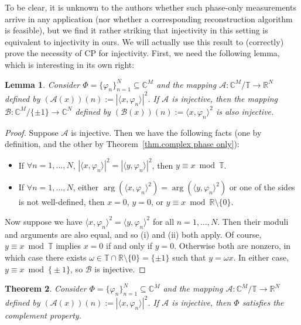 \documentclass[times,10pt]{elsarticle}
\theoremstyle{plain}
\newtheorem{theorem}{Theorem}
\newtheorem{lemma}[theorem]{Lemma}
\begin{document}
To be clear, it is unknown to the authors whether such phase-only measurements arrive in any application (nor whether a corresponding reconstruction algorithm is feasible), but we find it rather striking that injectivity in this setting is equivalent to injectivity in ours.
We will actually use this result to (correctly) prove the necessity of CP for injectivity.
First, we need the following lemma, which is interesting in its own right:

\begin{lemma}
\label{lem.injectivity of B}
Consider $\Phi=\{\varphi_n\}_{n=1}^N\subseteq\mathbb{C}^M$ and the mapping $\mathcal{A}\colon\mathbb{C}^M/\mathbb{T}\rightarrow\mathbb{R}^N$ defined by $(\mathcal{A}(x))(n):=|\langle x,\varphi_n\rangle|^2$.
If $\mathcal{A}$ is injective, then the mapping $\mathcal{B}\colon\mathbb{C}^M/\{\pm1\}\rightarrow\mathbb{C}^N$ defined by $(\mathcal{B}(x))(n):=\langle x,\varphi_n\rangle^2$ is also injective.
\end{lemma}

\begin{proof}
Suppose $\mathcal{A}$ is injective.
Then we have the following facts (one by definition, and the other by Theorem~\ref{thm.complex phase only}):
\begin{itemize}
\item[(i)] If $\forall n=1,\ldots,N$, $|\langle x,\varphi_n\rangle|^2=|\langle y,\varphi_n\rangle|^2$, then $y\equiv x\bmod\mathbb{T}$.
\item[(ii)] If $\forall n=1,\ldots,N$, either $\operatorname{arg}(\langle x,\varphi_n\rangle^2)=\operatorname{arg}(\langle y,\varphi_n\rangle^2)$ or one of the sides is not well-defined, then $x=0$, $y=0$, or $y\equiv x\bmod\mathbb{R}\setminus\{0\}$.
\end{itemize}
Now suppose we have $\langle x,\varphi_n\rangle^2=\langle y,\varphi_n\rangle^2$ for all $n=1,\ldots,N$.
Then their moduli and arguments are also equal, and so (i) and (ii) both apply.
Of course, $y\equiv x\bmod\mathbb{T}$ implies $x=0$ if and only if $y=0$.
Otherwise both are nonzero, in which case there exists $\omega\in\mathbb{T}\cap\mathbb{R}\setminus\{0\}=\{\pm1\}$ such that $y=\omega x$.
In either case, $y\equiv x\bmod\{\pm1\}$, so $\mathcal{B}$ is injective.
\qquad
\end{proof}

\begin{theorem}
\label{thm.complex complement property}
Consider $\Phi=\{\varphi_n\}_{n=1}^N\subseteq\mathbb{C}^M$ and the mapping $\mathcal{A}\colon\mathbb{C}^M/\mathbb{T}\rightarrow\mathbb{R}^N$ defined by $(\mathcal{A}(x))(n):=|\langle x,\varphi_n\rangle|^2$.
If $\mathcal{A}$ is injective, then $\Phi$ satisfies the complement property.
\end{theorem}
\end{document}
